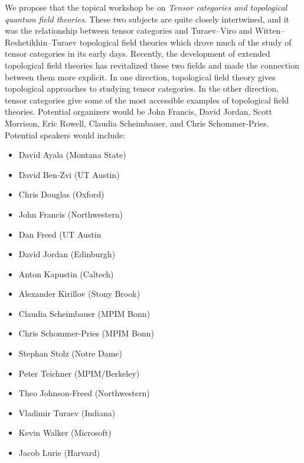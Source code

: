 \documentclass[12pt]{article}
\begin{document}
We propose that the topical workshop be on \emph{Tensor categories and topological quantum field theories}. These two subjects are quite closely intertwined, and it was the relationship between tensor categories and Turaev--Viro and Witten--Reshetikhin--Turaev topological field theories which drove much of the study of tensor categories in its early days.  Recently, the development of extended topological field theories has revitalized these two fields and made the connection between them more explicit. In one direction, topological field theory gives topological approaches to studying tensor categories. In the other direction, tensor categories give some of the most accessible examples of topological field theories. 
Potential organizers would be John Francis, David Jordan, Scott Morrison, Eric Rowell, Claudia Scheimbauer, and Chris Schommer-Pries.
Potential speakers would include:
\begin{multicols}{2}
\begin{itemize}
  \setlength{\itemsep}{1pt}
  \setlength{\parskip}{0pt}
  \setlength{\parsep}{0pt}
\item David Ayala	(Montana State)
\item David Ben-Zvi (UT Austin)
\item Chris Douglas	(Oxford)
\item John Francis (Northwestern)
\item Dan Freed	(UT Austin
\item David Jordan (Edinburgh)
\item Anton Kapustin	(Caltech)
\item Alexander Kirillov	(Stony Brook)
\item Claudia Scheimbauer	(MPIM Bonn)
\item Chris Schommer-Pries	(MPIM Bonn)
\item Stephan Stolz	(Notre Dame)
\item Peter Teichner	(MPIM/Berkeley)
\item Theo Johnson-Freed	(Northwestern)
\item Vladimir Turaev	(Indiana)
\item Kevin Walker (Microsoft)
\item Jacob Lurie (Harvard)
\end{itemize}
\end{multicols}
\end{document}
